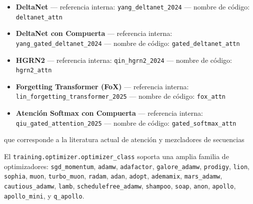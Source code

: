 \documentclass[11pt,a4paper]{article}
\begin{document}
\begin{itemize}[leftmargin=*]
    \item \textbf{DeltaNet} --- referencia interna: \texttt{yang\_deltanet\_2024} --- nombre de código: \texttt{deltanet\_attn}
    \item \textbf{DeltaNet con Compuerta} --- referencia interna: \texttt{yang\_gated\_deltanet\_2024} --- nombre de código: \texttt{gated\_deltanet\_attn}
    \item \textbf{HGRN2} --- referencia interna: \texttt{qin\_hgrn2\_2024} --- nombre de código: \texttt{hgrn2\_attn}
    \item \textbf{Forgetting Transformer (FoX)} --- referencia interna: \texttt{lin\_forgetting\_transformer\_2025} --- nombre de código: \texttt{fox\_attn}
    \item \textbf{Atención Softmax con Compuerta} --- referencia interna: \texttt{qiu\_gated\_attention\_2025} --- nombre de código: \texttt{gated\_softmax\_attn}
\end{itemize}

que corresponde a la literatura actual de atención y mezcladores de secuencias \citep{sun_retentive_2023,gu_mamba_2023,zhang_continuous_2021,behrouz_titans_2025,ramapuram_theory_2024,vaswani_attention_2017,child_sparse_transformer_2019,beltagy_longformer_2020,zaheer_bigbird_2020,lou_sparsek_2024,yuan_nsa_2025,zhang_spargeattn_2025,wang_fasa_2026,yang_gla_2023,yang_deltanet_2024,yang_gated_deltanet_2024,qin_hgrn2_2024,lin_forgetting_transformer_2025,qiu_gated_attention_2025}

El \texttt{training.optimizer.optimizer\_class} soporta una amplia familia de optimizadores:
\texttt{sgd\_momentum}, \texttt{adamw}, \texttt{adafactor}, \texttt{galore\_adamw}, \texttt{prodigy}, \texttt{lion}, \texttt{sophia}, \texttt{muon}, \texttt{turbo\_muon}, \texttt{radam}, \texttt{adan}, \texttt{adopt}, \texttt{ademamix}, \texttt{mars\_adamw}, \texttt{cautious\_adamw}, \texttt{lamb}, \texttt{schedulefree\_adamw}, \texttt{shampoo}, \texttt{soap}, \texttt{anon}, \texttt{apollo}, \texttt{apollo\_mini}, y \texttt{q\_apollo}.
\end{document}
